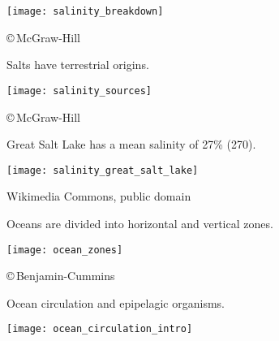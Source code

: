 \documentclass[t]{beamer}
\begin{document}


\begin{frame}[t]%
	\begin{center}
		\texttt{[image: salinity\_breakdown]}
	\end{center}

	\vfilll

	\hfill \tiny \copyright\,McGraw-Hill
\end{frame}
%
\begin{frame}[t]{Salts have terrestrial origins.}
	\begin{center}
		\texttt{[image: salinity\_sources]}
	\end{center}

	\vfilll

	\hfill \tiny \copyright\,McGraw-Hill
\end{frame}
%
\begin{frame}[t]{Great Salt Lake has a mean salinity of 27\% (270\text{\textperthousand}).}
	\begin{center}
		\texttt{[image: salinity\_great\_salt\_lake]}
	\end{center}

	\tiny Wikimedia Commons, public domain
\end{frame}
%
\begin{frame}[t]{Oceans are divided into horizontal and vertical zones.}
	\begin{center}
		\texttt{[image: ocean\_zones]}
	\end{center}

	\vfilll

	\hfill \tiny \copyright\,Benjamin-Cummins
\end{frame}
%
\begin{frame}[t]{Ocean circulation and epipelagic organisms.}
	\begin{center}
		\texttt{[image: ocean\_circulation\_intro]}
	\end{center}

	\vfilll

\end{frame}
\end{document}
